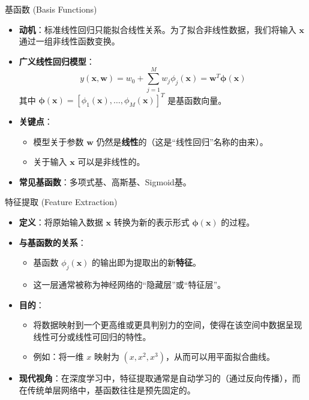 \documentclass[12pt, aspectratio=169]{beamer}
\newcommand{\vect}[1]{\mathbf{#1}}
\begin{document}
\begin{frame}{基函数 (Basis Functions)}
    \begin{itemize}
        \item \textbf{动机}：标准线性回归只能拟合线性关系。为了拟合非线性数据，我们将输入 $\vect{x}$ 通过一组非线性函数变换。
        \item \textbf{广义线性回归模型}：
        $$ y(\vect{x}, \vect{w}) = w_0 + \sum_{j=1}^M w_j \phi_j(\vect{x}) = \vect{w}^T \boldsymbol{\phi}(\vect{x}) $$
        其中 $\boldsymbol{\phi}(\vect{x}) = [\phi_1(\vect{x}), \dots, \phi_M(\vect{x})]^T$ 是基函数向量。
        \item \textbf{关键点}：
        \begin{itemize}
            \item 模型关于参数 $\vect{w}$ 仍然是\textbf{线性}的（这是“线性回归”名称的由来）。
            \item 关于输入 $\vect{x}$ 可以是非线性的。
        \end{itemize}
        \item \textbf{常见基函数}：多项式基、高斯基、Sigmoid基。
    \end{itemize}
\end{frame}

\begin{frame}{特征提取 (Feature Extraction)}
    \begin{itemize}
        \item \textbf{定义}：将原始输入数据 $\vect{x}$ 转换为新的表示形式 $\boldsymbol{\phi}(\vect{x})$ 的过程。
        \item \textbf{与基函数的关系}：
        \begin{itemize}
            \item 基函数 $\phi_j(\vect{x})$ 的输出即为提取出的新\textbf{特征}。
            \item 这一层通常被称为神经网络的“隐藏层”或“特征层”。
        \end{itemize}
        \item \textbf{目的}：
        \begin{itemize}
            \item 将数据映射到一个更高维或更具判别力的空间，使得在该空间中数据呈现线性可分或线性可回归的特性。
            \item 例如：将一维 $x$ 映射为 $(x, x^2, x^3)$，从而可以用平面拟合曲线。
        \end{itemize}
        \item \textbf{现代视角}：在深度学习中，特征提取通常是自动学习的（通过反向传播），而在传统单层网络中，基函数往往是预先固定的。
    \end{itemize}
\end{frame}
\end{document}
